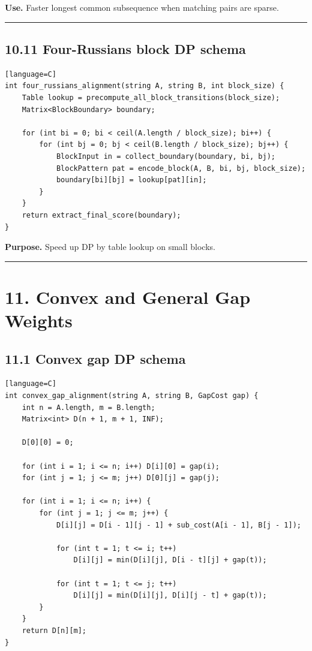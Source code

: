 \documentclass[11pt]{article}
\begin{document}
\textbf{Use.} Faster longest common subsequence when matching pairs are sparse.

\begin{center}\rule{0.5\linewidth}{0.5pt}\end{center}

\subsection{10.11 Four-Russians block DP schema}\label{four-russians-block-dp-schema}

\begin{verbatim}[language=C]
int four_russians_alignment(string A, string B, int block_size) {
    Table lookup = precompute_all_block_transitions(block_size);
    Matrix<BlockBoundary> boundary;

    for (int bi = 0; bi < ceil(A.length / block_size); bi++) {
        for (int bj = 0; bj < ceil(B.length / block_size); bj++) {
            BlockInput in = collect_boundary(boundary, bi, bj);
            BlockPattern pat = encode_block(A, B, bi, bj, block_size);
            boundary[bi][bj] = lookup[pat][in];
        }
    }
    return extract_final_score(boundary);
}
\end{verbatim}

\textbf{Purpose.} Speed up DP by table lookup on small blocks.

\begin{center}\rule{0.5\linewidth}{0.5pt}\end{center}

\section{11. Convex and General Gap Weights}\label{convex-and-general-gap-weights}

\subsection{11.1 Convex gap DP schema}\label{convex-gap-dp-schema}

\begin{verbatim}[language=C]
int convex_gap_alignment(string A, string B, GapCost gap) {
    int n = A.length, m = B.length;
    Matrix<int> D(n + 1, m + 1, INF);

    D[0][0] = 0;

    for (int i = 1; i <= n; i++) D[i][0] = gap(i);
    for (int j = 1; j <= m; j++) D[0][j] = gap(j);

    for (int i = 1; i <= n; i++) {
        for (int j = 1; j <= m; j++) {
            D[i][j] = D[i - 1][j - 1] + sub_cost(A[i - 1], B[j - 1]);

            for (int t = 1; t <= i; t++)
                D[i][j] = min(D[i][j], D[i - t][j] + gap(t));

            for (int t = 1; t <= j; t++)
                D[i][j] = min(D[i][j], D[i][j - t] + gap(t));
        }
    }
    return D[n][m];
}
\end{verbatim}
\end{document}

